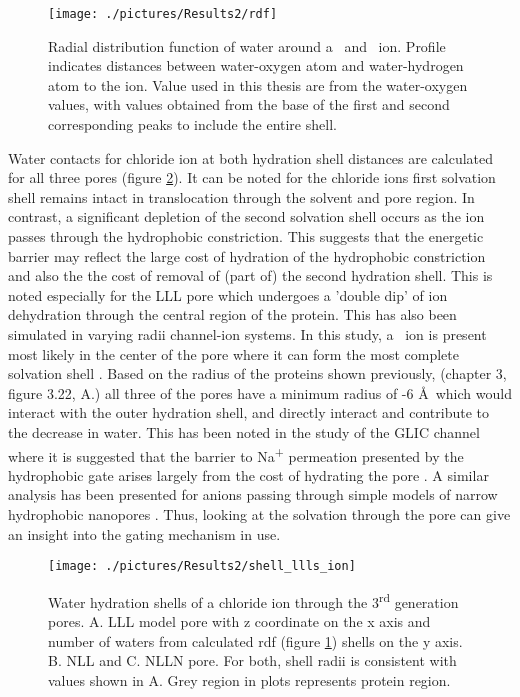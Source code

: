 \begin{figure}[H]
\begin{center}
\texttt{[image: ./pictures/Results2/rdf]}
\caption[Radial distribution function of water around a \Cl\ and \Na\ ion.] {Radial distribution function of water around a \Cl\ and \Na\ ion. Profile indicates distances between water-oxygen atom and water-hydrogen atom to the ion. Value used in this thesis are from the water-oxygen values, with values obtained from the base of the first and second corresponding peaks to include the entire shell.}  %
\label{fig:rdf}
\end{center}
\end{figure}

Water contacts for chloride ion at both hydration shell distances are calculated for all three pores (figure \ref{fig:shells_llls_ion}). It can be noted for the chloride ions first solvation shell remains intact in translocation through the solvent and pore region. In contrast, a significant depletion of the second solvation shell occurs as the ion passes through the hydrophobic constriction. This suggests that the energetic barrier may reflect the large cost of hydration of the hydrophobic constriction and also the the cost of removal of (part of) the second hydration shell. This is noted especially for the LLL pore which undergoes a 'double dip' of ion dehydration through the central region of the protein. This has also been simulated in varying radii channel-ion systems. In this study, a \Na\ ion is present most likely in the center of the pore where it can form the most complete solvation shell \cite{Lynden-Bell1996a}.  Based on the radius of the proteins shown previously, (chapter 3, figure 3.22, A.) all three of the pores have a minimum radius of -6 \AA\ which would interact with the outer hydration shell, and directly interact and contribute to the decrease in water. This has been noted in the study of the GLIC channel where it is suggested that the barrier to Na\textsuperscript{+} permeation presented by the hydrophobic gate arises largely from the cost of hydrating the pore \cite{Zhu2012}. A similar analysis has been presented for anions passing through simple models of narrow hydrophobic nanopores \cite{Richards2012}. Thus, looking at the solvation through the pore can give an insight into the gating mechanism in use. 

\begin{figure}[H]
\begin{center}
\texttt{[image: ./pictures/Results2/shell\_llls\_ion]}
\caption[Water hydration shells of a chloride ion through the 3\textsuperscript{rd} generation pores.] {Water hydration shells of a chloride ion through the 3\textsuperscript{rd} generation pores. A. LLL model pore with z coordinate on the x axis and number of waters from calculated rdf (figure \ref{fig:rdf}) shells on the y axis. B. NLL and C. NLLN pore. For both, shell radii is consistent with values shown in A. Grey region in plots represents protein region.} %
\label{fig:shells_llls_ion}
\end{center}
\end{figure}

